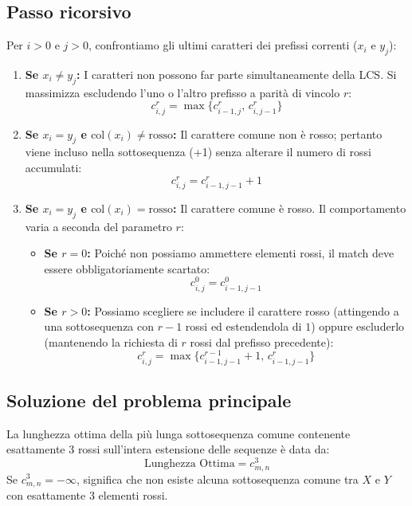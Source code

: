 \subsection{Passo ricorsivo}
Per $i > 0$ e $j > 0$, confrontiamo gli ultimi caratteri dei prefissi correnti ($x_i$ e $y_j$):
\begin{enumerate}
    \item \textbf{Se $x_i \neq y_j$:} I caratteri non possono far parte simultaneamente della LCS. Si massimizza escludendo l'uno o l'altro prefisso a parità di vincolo $r$:
    \begin{equation*}
        c_{i,j}^r = \max\{c_{i-1, j}^r, \, c_{i, j-1}^r\}
    \end{equation*}

    \item \textbf{Se $x_i = y_j$ e $\text{col}(x_i) \neq \text{rosso}$:} Il carattere comune non è rosso; pertanto viene incluso nella sottosequenza (+1) senza alterare il numero di rossi accumulati:
    \begin{equation*}
        c_{i,j}^r = c_{i-1, j-1}^r + 1
    \end{equation*}

    \item \textbf{Se $x_i = y_j$ e $\text{col}(x_i) = \text{rosso}$:} Il carattere comune è rosso. Il comportamento varia a seconda del parametro $r$:
    \begin{itemize}
        \item \textbf{Se $r = 0$:} Poiché non possiamo ammettere elementi rossi, il match deve essere obbligatoriamente scartato:
        \begin{equation*}
            c_{i,j}^0 = c_{i-1, j-1}^0
        \end{equation*}
        \item \textbf{Se $r > 0$:} Possiamo scegliere se includere il carattere rosso (attingendo a una sottosequenza con $r-1$ rossi ed estendendola di $1$) oppure escluderlo (mantenendo la richiesta di $r$ rossi dal prefisso precedente):
        \begin{equation*}
            c_{i,j}^r = \max\{c_{i-1, j-1}^{r-1} + 1, \, c_{i-1, j-1}^r\}
        \end{equation*}
    \end{itemize}
\end{enumerate}

\subsection{Soluzione del problema principale}
La lunghezza ottima della più lunga sottosequenza comune contenente esattamente 3 rossi sull'intera estensione delle sequenze è data da:
\begin{equation*}
    \text{Lunghezza Ottima} = c_{m, n}^3
\end{equation*}
Se $c_{m, n}^3 = -\infty$, significa che non esiste alcuna sottosequenza comune tra $X$ e $Y$ con esattamente 3 elementi rossi.

